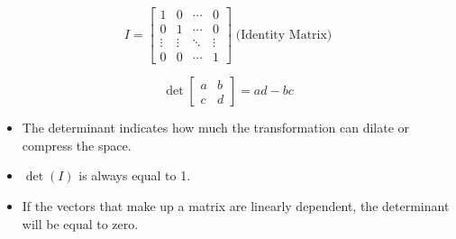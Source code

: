 \documentclass[10pt,a4paper]{Template}
\begin{document}
\begin{minipage}{0.48\textwidth}
\topic[Matrices]

\[
I
= \begin{bmatrix} 
1 & 0 & \cdots & 0\\ 
0 & 1 & \cdots & 0 \\ 
\vdots & \vdots & \ddots & \vdots \\ 
0 & 0 & \cdots & 1
\end{bmatrix} 
\; \text{(Identity Matrix)}
\]

\vspace{0.30cm}

\divider

\[ \det \begin{bmatrix}
a & b \\ 
c & d
\end{bmatrix}
= 
a d - b c 
\] 
\begin{itemize}
    \item The determinant indicates how much the transformation can dilate or compress the space.
    \item $\det(I)$ is always equal to 1.
    \item If the vectors that make up a matrix are linearly dependent, the determinant will be equal to zero. 
\end{itemize}
\divider
  
\end{minipage}
\hfill
\end{document}
